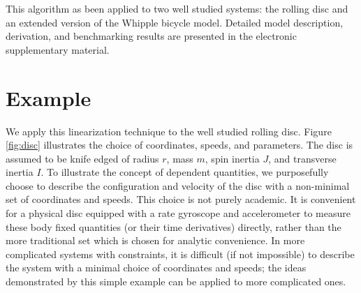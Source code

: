 \documentclass[smallcondensed]{svjour3}                     %
\begin{document}
This algorithm as been applied to two well studied systems: the rolling disc
and an extended version of the Whipple bicycle model\cite{Meijaard2007}.
Detailed model description, derivation, and benchmarking results are presented
in the electronic supplementary material.

\section{Example}
\label{example}
We apply this linearization technique to the well studied rolling disc.  Figure
\ref{fig:disc} illustrates the choice of coordinates, speeds, and parameters.
The disc is assumed to be knife edged of radius $r$, mass $m$, spin inertia
$J$, and transverse inertia $I$.  To illustrate the concept of dependent
quantities, we purposefully choose to describe the configuration and velocity
of the disc with a non-minimal set of coordinates and speeds.  This choice is
not purely academic.  It is convenient for a physical disc equipped with a rate
gyroscope and accelerometer to measure these body fixed quantities (or their
time derivatives) directly, rather than the more traditional set which is
chosen for analytic convenience.  In more complicated systems with constraints,
it is difficult (if not impossible) to describe the system with a minimal
choice of coordinates and speeds; the ideas demonstrated by this simple example
can be applied to more complicated ones.
\end{document}
